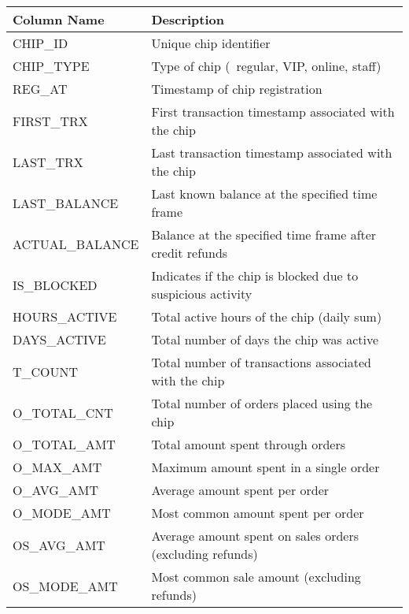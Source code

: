 		{\renewcommand{\arraystretch}{1.2}
\begin{table}[htbp]
	\centering
	\footnotesize
	\begin{tabularx}{\textwidth}{
		|>{\columncolor{unicorn_blue!5}\raggedright\arraybackslash}p{4.5cm}
		|>{\columncolor{unicorn_blue!5}\raggedright\arraybackslash}X|
	}
		\hline
		\rowcolor{unicorn_blue}
		\normalsize{\textbf{\color{white} Column Name}} & \normalsize{\textbf{\color{white} Description}} \\
		\hline
		\hline
		CHIP\_ID & Unique chip identifier \\\hline
		CHIP\_TYPE & Type of chip (\eg~regular, VIP, online, staff) \\\hline
		REG\_AT & Timestamp of chip registration \\\hline
		FIRST\_TRX & First transaction timestamp associated with the chip \\\hline
		LAST\_TRX & Last transaction timestamp associated with the chip \\\hline
		LAST\_BALANCE & Last known balance at the specified time frame \\\hline
		ACTUAL\_BALANCE & Balance at the specified time frame after credit refunds \\\hline
		\noalign{\vspace{2mm}}
		\hline
		IS\_BLOCKED & Indicates if the chip is blocked due to suspicious activity \\\hline
		HOURS\_ACTIVE & Total active hours of the chip (daily sum) \\\hline
		DAYS\_ACTIVE & Total number of days the chip was active \\\hline
		\noalign{\vspace{2mm}}
		\hline
		T\_COUNT & Total number of transactions associated with the chip \\\hline
		O\_TOTAL\_CNT & Total number of orders placed using the chip \\\hline
		O\_TOTAL\_AMT & Total amount spent through orders \\\hline
		O\_MAX\_AMT & Maximum amount spent in a single order \\\hline
		O\_AVG\_AMT & Average amount spent per order \\\hline
		O\_MODE\_AMT & Most common amount spent per order \\\hline
		OS\_AVG\_AMT & Average amount spent on sales orders (excluding refunds) \\\hline
		OS\_MODE\_AMT & Most common sale amount (excluding refunds) \\\hline

\end{tabularx}
\end{table}}
